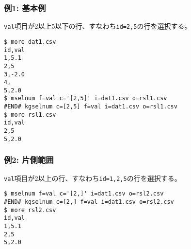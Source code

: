 \subsubsection*{例1: 基本例}

\verb|val|項目が2以上5以下の行、すなわち\verb|id=2,5|の行を選択する。


\begin{Verbatim}[baselinestretch=0.7,frame=single]
$ more dat1.csv
id,val
1,5.1
2,5
3,-2.0
4,
5,2.0
$ mselnum f=val c='[2,5]' i=dat1.csv o=rsl1.csv
#END# kgselnum c=[2,5] f=val i=dat1.csv o=rsl1.csv
$ more rsl1.csv
id,val
2,5
5,2.0
\end{Verbatim}
\subsubsection*{例2: 片側範囲}

\verb|val|項目が2以上の行、すなわち\verb|id=1,2,5|の行を選択する。


\begin{Verbatim}[baselinestretch=0.7,frame=single]
$ mselnum f=val c='[2,]' i=dat1.csv o=rsl2.csv
#END# kgselnum c=[2,] f=val i=dat1.csv o=rsl2.csv
$ more rsl2.csv
id,val
1,5.1
2,5
5,2.0
\end{Verbatim}
